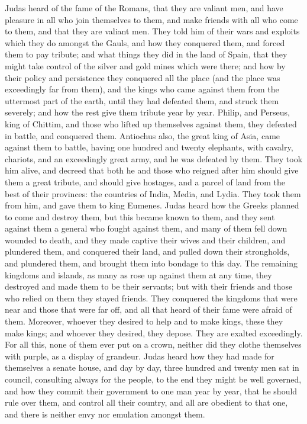  Judas heard of the fame of the Romans, that they are
valiant men, and have pleasure in all who join themselves to them, and
make friends with all who come to them,  and that they are
valiant men. They told him of their wars and exploits which they do
amongst the Gauls, and how they conquered them, and forced them to pay
tribute;  and what things they did in the land of Spain,
that they might take control of the silver and gold mines which were
there;  and how by their policy and persistence they
conquered all the place (and the place was exceedingly far from them),
and the kings who came against them from the uttermost part of the
earth, until they had defeated them, and struck them severely; and how
the rest give them tribute year by year.  Philip, and
Perseus, king of Chittim, and those who lifted up themselves against
them, they defeated in battle, and conquered them. 
Antiochus also, the great king of Asia, came against them to battle,
having one hundred and twenty elephants, with cavalry, chariots, and an
exceedingly great army, and he was defeated by them.  They
took him alive, and decreed that both he and those who reigned after him
should give them a great tribute, and should give hostages, and a parcel
of land from the best of their provinces:  the countries of
India, Media, and Lydia. They took them from him, and gave them to king
Eumenes.  Judas heard how the Greeks planned to come and
destroy them,  but this became known to them, and they sent
against them a general who fought against them, and many of them fell
down wounded to death, and they made captive their wives and their
children, and plundered them, and conquered their land, and pulled down
their strongholds, and plundered them, and brought them into bondage to
this day.  The remaining kingdoms and islands, as many as
rose up against them at any time, they destroyed and made them to be
their servants;  but with their friends and those who
relied on them they stayed friends. They conquered the kingdoms that
were near and those that were far off, and all that heard of their fame
were afraid of them.  Moreover, whoever they desired to
help and to make kings, these they make kings; and whoever they desired,
they depose. They are exalted exceedingly.  For all this,
none of them ever put on a crown, neither did they clothe themselves
with purple, as a display of grandeur.  Judas heard how
they had made for themselves a senate house, and day by day, three
hundred and twenty men sat in council, consulting always for the people,
to the end they might be well governed,  and how they
commit their government to one man year by year, that he should rule
over them, and control all their country, and all are obedient to that
one, and there is neither envy nor emulation amongst them.

